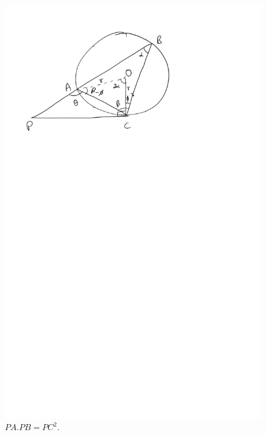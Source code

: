 	\begin{figure}[!h]
		\begin{center}
			
			\includegraphics[width=\columnwidth]{./figs/ch4_tangent_prod}
			\vspace*{-10cm}
		\end{center}
		\caption{$PA.PB = PC^2$.}
		\label{ch4_tangent_prod}	
	\end{figure}


